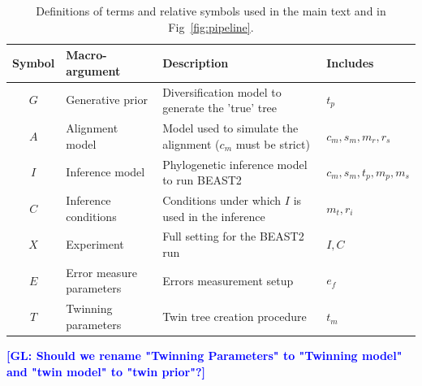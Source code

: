 \documentclass{article}
\newcommand{\giovanni}[1]{\textcolor{blue}{\textbf{[GL: #1]}}}
\begin{document}
\begin{table}
  \begin{tabular}{|@{}c|p{4cm}|p{9cm}|p{3cm}@{}|}
    \hline
    \centering
    \textbf{Symbol} & \textbf{Macro-argument} & \textbf{Description} & \textbf{Includes} \\
    \hline
    $\mathit{G}$ & Generative prior & Diversification model to generate the 'true' tree & $\mathit{t_{p}}$ \\
    $\mathit{A}$ & Alignment model & Model used to simulate the alignment ($\mathit{c_{m}}$ must be strict) & $\mathit{c_{m}}, \mathit{s_{m}}, \mathit{m_{r}}, \mathit{r_{s}}$ \\
    $\mathit{I}$ & Inference model & Phylogenetic inference model to run BEAST2 & $\mathit{c_{m}},\mathit{s_{m}},\mathit{t_{p}},\mathit{m_{p}},\mathit{m_{s}}$ \\
    $\mathit{C}$ & Inference conditions & Conditions under which $\mathit{I}$ is used in the inference & $\mathit{m_{t}}, \mathit{r_{i}}$\\
    $\mathit{X}$ & Experiment & Full setting for the BEAST2 run & $\mathit{I},\mathit{C}$ \\
    $\mathit{E}$ & Error measure parameters & Errors measurement setup & $\mathit{e_{f}}$\\
    $\mathit{T}$ & Twinning parameters & Twin tree creation procedure & $\mathit{t_{m}}$\\
    \hline 
  \end{tabular}
  \caption{
    Definitions of terms and relative symbols used in the main text and in Fig~\ref{fig:pipeline}.
  }
  \label{tab:definitions}
  \giovanni{Should we rename "Twinning Parameters" to "Twinning model" and "twin model" to "twin prior"?}
\end{table}
\end{document}
